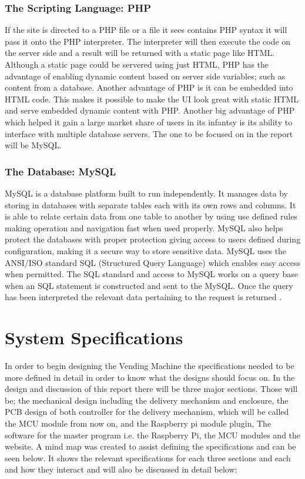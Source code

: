 \documentclass[a4paper,11pt]{article}
\numberwithin{figure}{subsection}
\begin{document}
\subsubsection{The Scripting Language: PHP}
If the site is directed to a PHP file or a file it sees contains PHP syntax it will pass it onto the PHP interpreter. The interpreter will then execute the code on the server side and a result will be returned with a static page like HTML. Although a static page could be servered using just HTML, PHP has the advantage of enabling dynamic content based on server side variables; such as content from a database. Another advantage of PHP is it can be embedded into HTML code. This makes it possible to make the UI look great with static HTML and serve embedded dynamic content with PHP. Another big advantage of PHP which helped it gain a large market share of users in its infantsy is its ability to interface with multiple database servers. The one to be focused on in the report will be MySQL.


\subsubsection{The Database: MySQL}
MySQL is a database platform built to run independently. It manages data by storing in databases with separate tables each with its own rows and columns. It is able to relate certain data from one table to another by using use defined rules making operation and navigation fast when used properly. MySQL also helps protect the databases with proper protection giving access to users defined during configuration, making it a secure way to store sensitive data. MySQL uses the ANSI/ISO standard SQL (Structured Query Language) which enables easy access when permitted. The SQL standard and access to MySQL works on a query base when an SQL statement is constructed and sent to the MySQL. Once the query has been interpreted the relevant data pertaining to the request is returned \cite{mysql}.  



	\newpage
\section{System Specifications}
In order to begin designing the Vending Machine the specifications needed to be more defined in detail in order to know what the designs should focus on. In the design and discussion of this report there will be three major sections. Those will be; the mechanical design including the delivery mechanism and enclosure, the PCB design of both controller for the delivery mechanism, which will be called the MCU module from now on, and the Raspberry pi module plugin, The software for the master program i.e. the Raspberry Pi, the MCU modules and the website. A mind map was created to assist defining the specifications and can be seen below. It shows the relevant specifications for each three sections and each and how they interact and will also be discussed in detail below:
\end{document}
